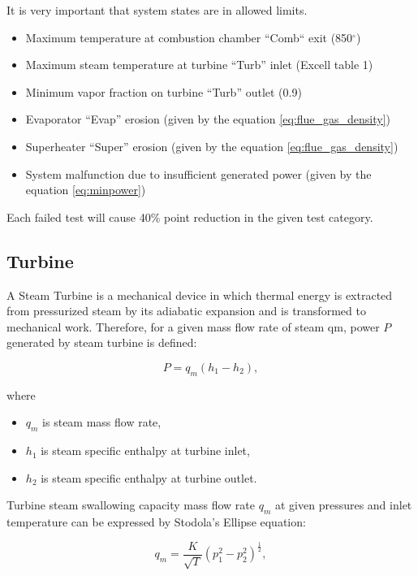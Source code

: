 \documentclass{article}
\begin{document}
	
	It is very important that system states are in allowed limits. 
	
	\begin{itemize}
		\item Maximum temperature at combustion chamber “Comb“ exit 
		(850$^\circ$)
		\item Maximum steam temperature at turbine “Turb” inlet (Excell table 1)
		\item Minimum vapor fraction on turbine “Turb” outlet (0.9)
		\item Evaporator “Evap” erosion (given by the equation 
		\ref{eq:flue_gas_density})
		\item Superheater “Super” erosion (given by the equation 
		\ref{eq:flue_gas_density})
		\item System malfunction due to insufficient generated power (given by 
		the equation \ref{eq:minpower})
	\end{itemize}

	Each failed test will cause 40\% point reduction in the given test category.
	
	\subsection{Turbine}
	
	A Steam Turbine is a mechanical device in which thermal energy is extracted from pressurized steam by its adiabatic expansion and is transformed to mechanical work.  Therefore, for a given mass flow rate of steam qm, power $P$ generated by steam turbine is defined:
	
	\begin{equation}\label{eq:power}
		P = q_m(h_1 - h_2),
	\end{equation}
	
	\noindent
	where 
	
	\begin{itemize}
		\item $q_m$ is steam mass flow rate, 
		\item $h_1$ is steam specific enthalpy at turbine inlet,
		\item $h_2$ is steam specific enthalpy at turbine outlet.
	\end{itemize}

	Turbine steam swallowing capacity mass flow rate $q_m$ at given pressures and inlet temperature can be expressed by Stodola’s Ellipse equation:
	
	\begin{equation}\label{eq:stodola}
		q_m = \frac{K}{\sqrt{T}}(p_1^2 - p_2^2)^\frac{1}{2},
	\end{equation}
	
\end{document}
